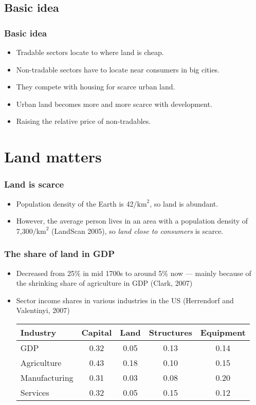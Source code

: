 \documentclass[handout,compress,mathserif]{beamer}
\begin{document}


\subsection{Basic idea}
\begin{frame}\frametitle{Basic idea}
\begin{itemize}
    \item Tradable sectors locate to where land is cheap.
    \item Non-tradable sectors have to locate near consumers in big cities.
    \item They compete with housing for scarce urban land.
    \item Urban land becomes more and more scarce with development.
    \item Raising the relative price of non-tradables.
\end{itemize}
\end{frame}





\section{Land matters}
\begin{frame}\frametitle{Land is scarce}
\begin{itemize}
    \item Population density of the Earth is 42$/\text{km}^2$, so land is abundant.
    \pause
    \item However, the average person lives in an area with a population density of 7,300$/\text{km}^2$ (LandScan 2005),
    so \emph{land close to consumers} is scarce.
\end{itemize}
\end{frame}

\begin{frame}\frametitle{The share of land in GDP}
\begin{itemize}
\item Decreased from 25\% in mid 1700s to around 5\% now --- mainly
because of the shrinking share of agriculture in GDP (Clark, 2007)
\item Sector income shares in various industries in the US (Herrendorf and Valentinyi, 2007)
\begin{center}
\begin{tabular}{l|c|ccc}
\hline\hline
Industry    & Capital   &   Land    & Structures    & Equipment \\ \hline
GDP         &   0.32    &   0.05    & 0.13          & 0.14      \\ \hline
Agriculture & 0.43      &   0.18    & 0.10          & 0.15      \\
Manufacturing & 0.31    &   0.03    & 0.08          & 0.20      \\
Services    & 0.32      & 0.05      & 0.15          & 0.12      \\ \hline\hline
\end{tabular}
\end{center}
\end{itemize}
\end{frame}
\end{document}
